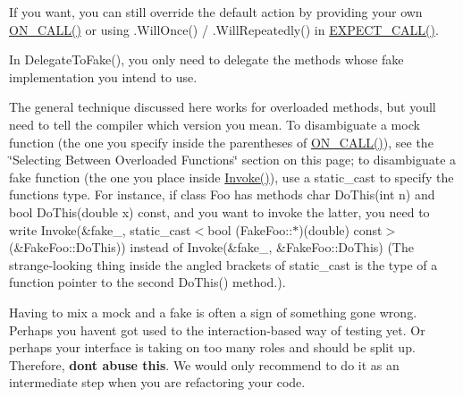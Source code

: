 \begin{DoxyItemize}
\item If you want, you can still override the default action by providing your own {\ttfamily \mbox{\hyperlink{googletest-master_2googlemock_2include_2gmock_2gmock-spec-builders_8h_a5b12ae6cf84f0a544ca811b380c37334}{O\+N\+\_\+\+C\+A\+L\+L()}}} or using {\ttfamily .Will\+Once()} / {\ttfamily .Will\+Repeatedly()} in {\ttfamily \mbox{\hyperlink{googletest-master_2googlemock_2include_2gmock_2gmock-spec-builders_8h_a535a6156de72c1a2e25a127e38ee5232}{E\+X\+P\+E\+C\+T\+\_\+\+C\+A\+L\+L()}}}.
\item In {\ttfamily Delegate\+To\+Fake()}, you only need to delegate the methods whose fake implementation you intend to use.
\item The general technique discussed here works for overloaded methods, but you\textquotesingle{}ll need to tell the compiler which version you mean. To disambiguate a mock function (the one you specify inside the parentheses of {\ttfamily \mbox{\hyperlink{googletest-master_2googlemock_2include_2gmock_2gmock-spec-builders_8h_a5b12ae6cf84f0a544ca811b380c37334}{O\+N\+\_\+\+C\+A\+L\+L()}}}), see the \char`\"{}\+Selecting Between Overloaded Functions\char`\"{} section on this page; to disambiguate a fake function (the one you place inside {\ttfamily \mbox{\hyperlink{namespacetesting_af5cacf4475557b5a3e37af3836564235}{Invoke()}}}), use a {\ttfamily static\+\_\+cast} to specify the function\textquotesingle{}s type. For instance, if class {\ttfamily Foo} has methods {\ttfamily char Do\+This(int n)} and {\ttfamily bool Do\+This(double x) const}, and you want to invoke the latter, you need to write {\ttfamily Invoke(\&fake\+\_\+, static\+\_\+cast$<$bool (Fake\+Foo\+:\+:$\ast$)(double) const$>$(\&Fake\+Foo\+::\+Do\+This))} instead of {\ttfamily Invoke(\&fake\+\_\+, \&\+Fake\+Foo\+::\+Do\+This)} (The strange-\/looking thing inside the angled brackets of {\ttfamily static\+\_\+cast} is the type of a function pointer to the second {\ttfamily Do\+This()} method.).
\item Having to mix a mock and a fake is often a sign of something gone wrong. Perhaps you haven\textquotesingle{}t got used to the interaction-\/based way of testing yet. Or perhaps your interface is taking on too many roles and should be split up. Therefore, {\bfseries{don\textquotesingle{}t abuse this}}. We would only recommend to do it as an intermediate step when you are refactoring your code.
\end{DoxyItemize}

